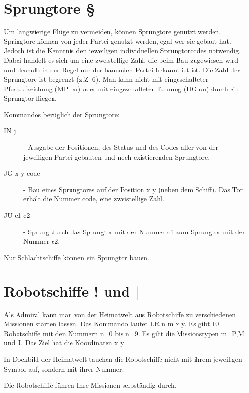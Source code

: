 \section{Sprungtore \S}

Um langwierige Fl\"uge zu vermeiden, k\"onnen Sprungtore genutzt werden.
Springtore k\"onnen von jeder Partei genutzt werden, egal wer sie gebaut
hat. Jedoch ist die Kenntnis den jeweiligen individuellen Sprungtorcodes
notwendig. Dabei handelt es sich um eine zweistellige Zahl, die beim
Bau zugewiesen wird und deshalb in der Regel nur der bauenden Partei
bekannt ist ist. Die Zahl der Sprungtore ist begrenzt (z.Z. 6). Man kann nicht
mit eingeschalteter Pfadaufzeichung (MP on) oder mit eingeschalteter Tarnung
(HO on) durch ein Sprungtor fliegen.

Kommandos bez\"uglich der Sprungtore:

\begin{description}
\item [IN j] - Ausgabe der Positionen, des Status und des Codes aller
               von der jeweiligen Partei gebauten und noch existierenden
               Sprungtore.
\item [JG x y code] - Bau eines Sprungtores auf der Position x y
          (neben dem Schiff). Das Tor erh\"alt die Nummer code, eine
          zweistellige Zahl.
\item [JU c1 c2] - Sprung durch das Sprungtor mit der Nummer c1 zum
          Sprungtor mit der Nummer c2.
\end{description}

Nur Schlachtschiffe k\"onnen ein Sprungtor bauen.


\section{Robotschiffe ! und $|$}

Als Admiral kann man von der Heimatwelt aus Robotschiffe zu verschiedenen
Missionen starten lassen. Das Kommando lautet LR n m x y.
Es gibt 10 Robotschiffe mit den Nummern n=0 bis n=9. Es gibt die 
Missionstypen m=P,M und J. Das Ziel hat die Koordinaten x y.

In Dockbild der Heimatwelt tauchen die Robotschiffe nicht mit ihrem jeweiligen
Symbol auf, sondern mit ihrer Nummer.

Die Robotschiffe f\"uhren Ihre Missionen selbst\" andig durch.

